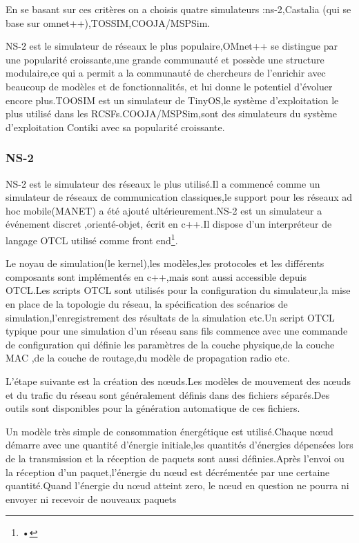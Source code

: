 En se basant sur ces critères on a choisis quatre simulateurs :ns-2,Castalia (qui se base sur omnet++),TOSSIM,COOJA/MSPSim.

NS-2 est le simulateur de réseaux le plus populaire,OMnet++ se distingue par une popularité croissante,une grande communauté et possède une structure modulaire,ce qui a permit a la communauté de chercheurs de l'enrichir avec beaucoup de modèles et de fonctionnalités, et lui donne le potentiel d'évoluer encore plus.TOOSIM est un simulateur de TinyOS,le système d'exploitation le plus utilisé dans les RCSFs.COOJA/MSPSim,sont des simulateurs du système d'exploitation Contiki avec sa popularité croissante. 

  
 \subsubsection{NS-2}
NS-2 est le simulateur des réseaux le plus utilisé.Il a commencé comme un simulateur de réseaux de communication classiques,le support pour les réseaux ad hoc mobile(MANET) a été ajouté ultérieurement.NS-2 est un simulateur a événement discret ,orienté-objet, écrit en c++.Il dispose d'un interpréteur de langage OTCL utilisé comme front end\footnote{•}.

Le noyau de simulation(le kernel),les modèles,les protocoles et les différents composants sont implémentés en c++,mais sont aussi accessible depuis OTCL.Les scripts OTCL sont utilisés pour la configuration du simulateur,la mise en place de la topologie du réseau, la spécification des scénarios de simulation,l'enregistrement des résultats de la simulation etc.Un script OTCL typique pour une simulation d'un réseau sans fils commence avec une commande de configuration qui définie les paramètres de la couche physique,de la couche MAC ,de  la couche de routage,du modèle de propagation radio etc.

L'étape suivante est la création des nœuds.Les modèles de mouvement des nœuds et du trafic du réseau sont généralement définis dans des fichiers séparés.Des outils sont disponibles pour la génération automatique de ces fichiers.

Un modèle très simple de consommation énergétique est utilisé.Chaque nœud démarre avec une quantité d'énergie initiale,les quantités d'énergies dépensées lors de la transmission et la réception de paquets sont aussi définies.Après l'envoi ou la réception d'un paquet,l'énergie du nœud est décrémentée par une certaine quantité.Quand l'énergie du nœud atteint zero, le nœud en question ne pourra ni envoyer ni recevoir de nouveaux paquets  

